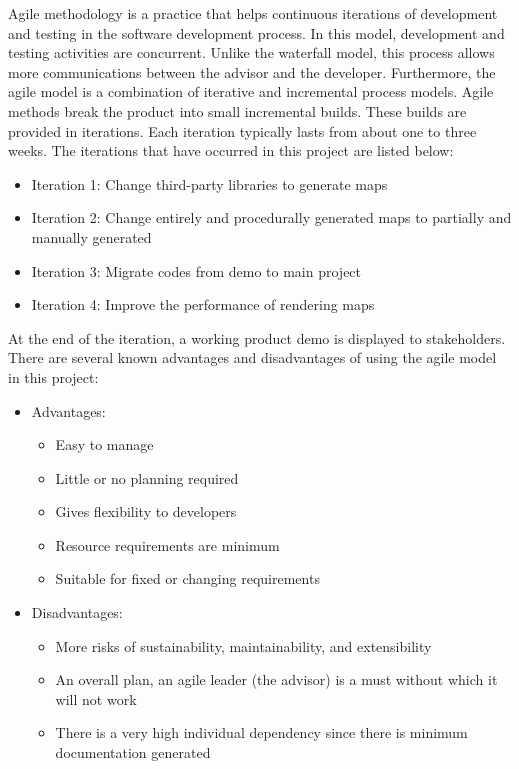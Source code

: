 Agile methodology is a practice that helps continuous iterations of development and testing in the software development process. In this model, development and testing activities are concurrent. Unlike the waterfall model, this process allows more communications between the advisor and the developer. Furthermore, the agile model is a combination of iterative and incremental process models. Agile methods break the product into small incremental builds. These builds are provided in iterations. Each iteration typically lasts from about one to three weeks. The iterations that have occurred in
this project are listed below:
\begin{itemize}
  \item Iteration 1: Change third-party libraries to generate maps
  \item Iteration 2: Change entirely and procedurally generated maps to partially and manually generated
  \item Iteration 3: Migrate codes from demo to main project
  \item Iteration 4: Improve the performance of rendering maps
\end{itemize}
At the end of the iteration, a working product demo is displayed to stakeholders. There are several known advantages and disadvantages of using the agile model in this project:
\begin{itemize}
  \item Advantages:
  \begin{itemize}
    \item Easy to manage
    \item Little or no planning required
    \item Gives flexibility to developers
    \item Resource requirements are minimum
    \item Suitable for fixed or changing requirements
  \end{itemize}
  \item Disadvantages:
  \begin{itemize}
    \item More risks of sustainability, maintainability, and extensibility
    \item An overall plan, an agile leader (the advisor) is a must without which it will not work
    \item There is a very high individual dependency since there is minimum documentation generated
  \end{itemize}
\end{itemize}

